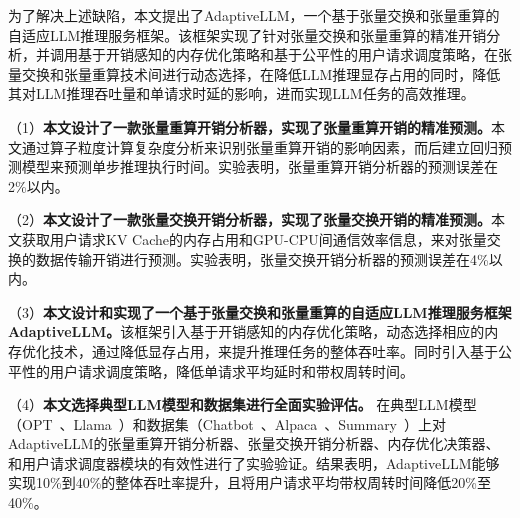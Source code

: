 为了解决上述缺陷，本文提出了AdaptiveLLM，一个基于张量交换和张量重算的自适应LLM推理服务框架。该框架实现了针对张量交换和张量重算的精准开销分析，并调用基于开销感知的内存优化策略和基于公平性的用户请求调度策略，在张量交换和张量重算技术间进行动态选择，在降低LLM推理显存占用的同时，降低其对LLM推理吞吐量和单请求时延的影响，进而实现LLM任务的高效推理。
    
\noindent（1）\textbf{本文设计了一款张量重算开销分析器，实现了张量重算开销的精准预测。}本文通过算子粒度计算复杂度分析来识别张量重算开销的影响因素，而后建立回归预测模型来预测单步推理执行时间。实验表明，张量重算开销分析器的预测误差在2\%以内。
    
\noindent（2）\textbf{本文设计了一款张量交换开销分析器，实现了张量交换开销的精准预测。}本文获取用户请求KV Cache的内存占用和GPU-CPU间通信效率信息，来对张量交换的数据传输开销进行预测。实验表明，张量交换开销分析器的预测误差在4\%以内。

\noindent（3）\textbf{本文设计和实现了一个基于张量交换和张量重算的自适应LLM推理服务框架AdaptiveLLM。}该框架引入基于开销感知的内存优化策略，动态选择相应的内存优化技术，通过降低显存占用，来提升推理任务的整体吞吐率。同时引入基于公平性的用户请求调度策略，降低单请求平均延时和带权周转时间。
    
\noindent（4）\textbf{本文选择典型LLM模型和数据集进行全面实验评估。} 在典型LLM模型（OPT~\cite{OPT}、Llama~\cite{Llama}）和数据集（Chatbot~\cite{Chatbot}、Alpaca~\cite{Alpaca}、Summary~\cite{Summary}）上对AdaptiveLLM的张量重算开销分析器、张量交换开销分析器、内存优化决策器、和用户请求调度器模块的有效性进行了实验验证。结果表明，AdaptiveLLM能够实现10\%到40\%的整体吞吐率提升，且将用户请求平均带权周转时间降低20\%至40\%。
